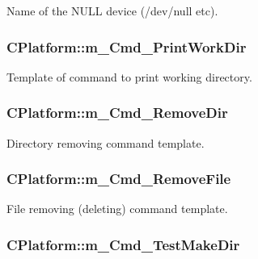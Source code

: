 Name of the N\-U\-L\-L device (/dev/null etc). 

\hypertarget{classCPlatform_ac73a69c8dd13152763b4020d37270f2e}{
\subsubsection[{m\-\_\-\-Cmd\-\_\-\-Print\-Work\-Dir}]{\setlength{\rightskip}{0pt plus 5cm}C\-Platform\-::m\-\_\-\-Cmd\-\_\-\-Print\-Work\-Dir\hspace{0.3cm}{\ttfamily [private]}}}\label{classCPlatform_ac73a69c8dd13152763b4020d37270f2e}


Template of command to print working directory. 

\hypertarget{classCPlatform_a842c6d884c42744de75eefca15d887e3}{
\subsubsection[{m\-\_\-\-Cmd\-\_\-\-Remove\-Dir}]{\setlength{\rightskip}{0pt plus 5cm}C\-Platform\-::m\-\_\-\-Cmd\-\_\-\-Remove\-Dir\hspace{0.3cm}{\ttfamily [private]}}}\label{classCPlatform_a842c6d884c42744de75eefca15d887e3}


Directory removing command template. 

\hypertarget{classCPlatform_a40f2310f005d8bece4137fb54d7dffcd}{
\subsubsection[{m\-\_\-\-Cmd\-\_\-\-Remove\-File}]{\setlength{\rightskip}{0pt plus 5cm}C\-Platform\-::m\-\_\-\-Cmd\-\_\-\-Remove\-File\hspace{0.3cm}{\ttfamily [private]}}}\label{classCPlatform_a40f2310f005d8bece4137fb54d7dffcd}


File removing (deleting) command template. 

\hypertarget{classCPlatform_abac12f91f09a69d46f3851317429185c}{
\subsubsection[{m\-\_\-\-Cmd\-\_\-\-Test\-Make\-Dir}]{\setlength{\rightskip}{0pt plus 5cm}C\-Platform\-::m\-\_\-\-Cmd\-\_\-\-Test\-Make\-Dir\hspace{0.3cm}{\ttfamily [private]}}}\label{classCPlatform_abac12f91f09a69d46f3851317429185c}


